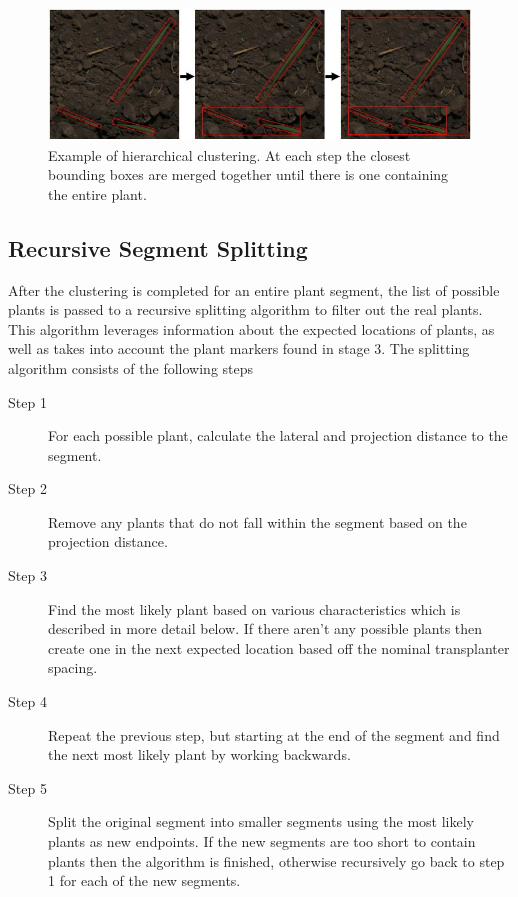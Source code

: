 \begin{figure}
	\centering
    \includegraphics[width=5in]{figures/clustering.jpg}
    \caption[Sweeping projection algorithm]{Example of hierarchical clustering. At each step the closest bounding boxes are merged together until there is one containing the entire plant.}
    \label{figure:clustering}
\end{figure}

\subsection{Recursive Segment Splitting}

After the clustering is completed for an entire plant segment, the list of possible plants is passed to a recursive splitting algorithm to filter out the real plants.  This algorithm leverages information about the expected locations of plants, as well as takes into account the plant markers found in stage 3.  The splitting algorithm consists of the following steps

\begin{description}
\item[Step 1] For each possible plant, calculate the lateral and projection distance to the segment.  
\item[Step 2] Remove any plants that do not fall within the segment based on the projection distance.
\item[Step 3] Find the most likely plant based on various characteristics which is described in more detail below.  If there aren't any possible plants then create one in the next expected location based off the nominal transplanter spacing.  
\item[Step 4] Repeat the previous step, but starting at the end of the segment and find the next most likely plant by working backwards.
\item[Step 5] Split the original segment into smaller segments using the most likely plants as new endpoints.  If the new segments are too short to contain plants then the algorithm is finished, otherwise recursively go back to step 1 for each of the new segments.
\end{description}

